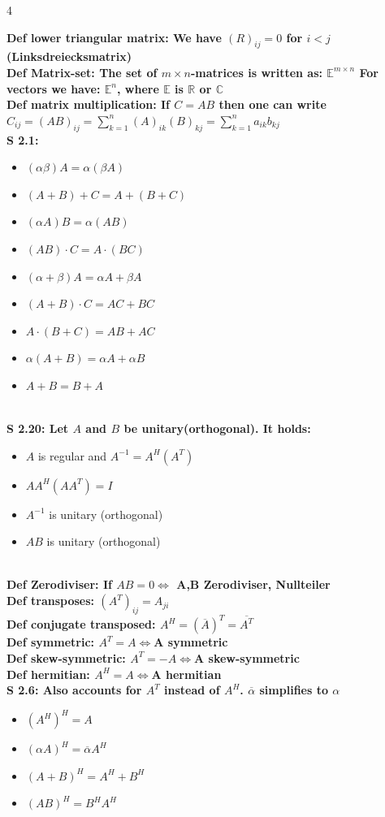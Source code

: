 \documentclass[7pt,landscape, margin = 0.1mm]{article}
\newcommand{\DEF}[2]{\color{chaptercolor}\bf{Def #1}:\color{black}    \hspace{0.2cm} #2 \\}
\newcommand{\SA}[2]{\color{chaptercolor}\bf{S #1}:\color{black}    \hspace{0.2cm} #2 \\}
\begin{document}
\begin{multicols}{4}
\begin{flushleft}
\DEF{lower triangular matrix}{We have $(R)_{ij} = 0$ for $i < j $ (Linksdreiecksmatrix)}
\DEF{Matrix-set}{The set of $ m \times n $-matrices is written as: $\mathbb{E}^{m \times n } $ For vectors we have: $ \mathbb{E}^{n}$, where $ \mathbb{E}$ is $ \mathbb{R}$ or $ \mathbb{C}$ }
\DEF{matrix multiplication}{If $C =AB $ then one can write $C_{ij} = (AB)_{ij} = \sum_{k=1}^{n} (A)_{ik}(B)_{kj} = \sum_{k=1}^{n} a_{ik}b_{kj}   $}
\SA{2.1}{\begin{itemize}
\item $(\alpha \beta)A= \alpha (\beta A)$
 \item $(A+B)+C= A+(B+C)$
 \item  $(\alpha A)B= \alpha (AB)$ 
 \item $(AB)\cdot C = A \cdot(BC)$
 \item $(\alpha + \beta)A= \alpha A + \beta A $
 \item $(A+B)\cdot C = AC+BC $
 \item $ A\cdot (B+C) = AB+AC $
 \item $ \alpha (A+B)= \alpha A + \alpha B$
 \item $A+B=B+A$
 
\end{itemize}}
\SA{2.20}{Let $A $ and $B$ be unitary(orthogonal). It holds:
\begin{itemize}
\item $A$ is regular and $A^{-1}=A^H (A^T) $
\item $AA^H (AA^T) = I $
\item $A^{-1} $ is unitary (orthogonal)
\item  $AB $ is unitary (orthogonal)
\end{itemize}

}
\DEF{Zerodiviser}{If $AB=0  \Leftrightarrow $ A,B Zerodiviser, Nullteiler}
\DEF{transposes}{ $ (A^T)_{ij}=A_{ji} $}
\DEF{conjugate transposed}{$ A^H = (\overline{A})^T=\overline{A^{T}}$}
\DEF{symmetric}{$A^T = A  \Leftrightarrow $A symmetric}
\DEF{skew-symmetric}{$A^T = -A  \Leftrightarrow $A skew-symmetric}
\DEF{hermitian}{$A^H = A  \Leftrightarrow $A hermitian}
\SA{2.6}{  Also accounts for $A^T $ instead of $A^H$.
$ \overline{ \alpha} $ simplifies to $\alpha $ 



\begin{itemize}
\item $(A^H)^H=A $
\item $(\alpha A)^H=\overline{\alpha} A^H $
\item $(A+B)^H=A^H+B^H$
\item $ (AB)^H=B^H A^H$
 

\end{itemize}}
\end{flushleft}
\end{multicols}
\end{document}
